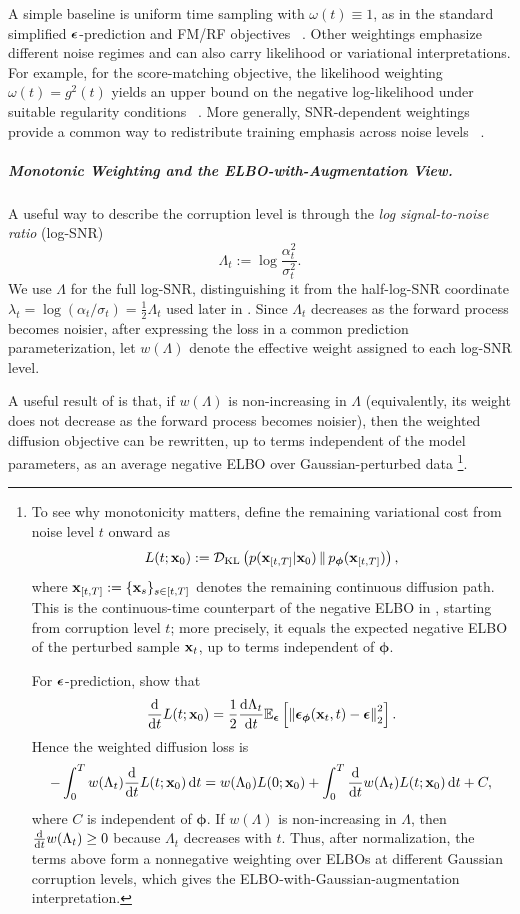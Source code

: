 A simple baseline is uniform time sampling with $\omega(t)\equiv1$, as in the
standard simplified ${\bm{\epsilon}}$-prediction and FM/RF objectives
~\citep{ho2020denoising,lipman2022flow,liu2022rectified}.
Other weightings emphasize different noise regimes and can also carry
likelihood or variational interpretations. For example, for the score-matching
objective, the likelihood weighting $\omega(t)=g^2(t)$ yields an upper bound
on the negative log-likelihood under suitable regularity conditions
~\citep{song2021maximum}. More generally, SNR-dependent weightings provide a
common way to redistribute training emphasis across noise levels
~\citep{kingma2021variational,kingma2023understanding}.

\subparagraph{Monotonic Weighting and the ELBO-with-Augmentation View.}
A useful way to describe the corruption level is through the
\emph{log signal-to-noise ratio} (log-SNR)
\[
\Lambda_t
:=
\log\frac{\alpha_t^2}{\sigma_t^2}.
\]
We use $\Lambda$ for the full log-SNR, distinguishing it from the
half-log-SNR coordinate
$\lambda_t=\log(\alpha_t/\sigma_t)=\tfrac12\Lambda_t$
used later in .
Since $\Lambda_t$ decreases as the forward process becomes noisier, after
expressing the loss in a common prediction parameterization, let
$w(\Lambda)$ denote the effective weight assigned to each log-SNR level.

A useful result of \citet{kingma2023understanding} is that, if
$w(\Lambda)$ is non-increasing in $\Lambda$ (equivalently, its weight does
not decrease as the forward process becomes noisier), then the weighted
diffusion objective can be rewritten, up to terms independent of the model
parameters, as an average negative ELBO over Gaussian-perturbed data%
\footnote{
To see why monotonicity matters, define the remaining variational cost from
noise level $t$ onward as
\[
L(t;{\mathbf{x}}_0)
:=
\mathcal{D}_{\mathrm{KL}}
\left(
p({\mathbf{x}}_{[t,T]}|{\mathbf{x}}_0)
\,\Vert\,
p_{\bm{\phi}}({\mathbf{x}}_{[t,T]})
\right),
\]
where ${\mathbf{x}}_{[t,T]}:=\{{\mathbf{x}}_s\}_{s\in[t,T]}$ denotes the remaining
continuous diffusion path. This is the continuous-time counterpart of the
negative ELBO in , starting from corruption level $t$;
more precisely, it equals the expected negative ELBO of the perturbed sample
${\mathbf{x}}_t$, up to terms independent of $\bm{\phi}$.

For ${\bm{\epsilon}}$-prediction, \citet{kingma2023understanding} show that
\[
\frac{\mathop{}\!\mathrm{d}}{\mathop{}\!\mathrm{d} t}L(t;{\mathbf{x}}_0)
=
\frac{1}{2}\frac{\mathop{}\!\mathrm{d}\Lambda_t}{\mathop{}\!\mathrm{d} t}
\mathbb{E}_{{\bm{\epsilon}}}
\left[
\left\|
{\bm{\epsilon}}_{\bm{\phi}}({\mathbf{x}}_t,t)-{\bm{\epsilon}}
\right\|_2^2
\right].
\]
Hence the weighted diffusion loss is
\[
-\int_0^T
w(\Lambda_t)
\frac{\mathop{}\!\mathrm{d}}{\mathop{}\!\mathrm{d} t}L(t;{\mathbf{x}}_0)\mathop{}\!\mathrm{d} t
=
w(\Lambda_0)L(0;{\mathbf{x}}_0)
+
\int_0^T
\frac{\mathop{}\!\mathrm{d}}{\mathop{}\!\mathrm{d} t}w(\Lambda_t)
L(t;{\mathbf{x}}_0)\mathop{}\!\mathrm{d} t
+
C,
\]
where $C$ is independent of $\bm{\phi}$.
If $w(\Lambda)$ is non-increasing in $\Lambda$, then
$\frac{\mathop{}\!\mathrm{d}}{\mathop{}\!\mathrm{d} t}w(\Lambda_t)\geq0$ because $\Lambda_t$ decreases with
$t$. Thus, after normalization, the terms above form a nonnegative weighting
over ELBOs at different Gaussian corruption levels, which gives the
ELBO-with-Gaussian-augmentation interpretation.
}.

